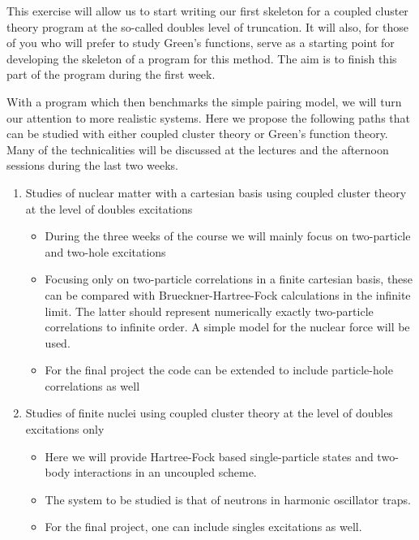\documentclass[%
twoside,                 %
final,                   %
10pt]{article}
\begin{document}
This exercise will allow us to start writing our first skeleton for a coupled cluster theory program at the so-called doubles level of truncation. It will also, for those of you who will prefer  to study Green's functions, serve as a 
starting point for developing the skeleton of a program for this method. The aim is to finish this part of the program during the first week.

With a program which then benchmarks the simple pairing model, we will turn our attention to more realistic systems.
Here we propose the following  paths that can be studied with either coupled cluster theory or Green's function theory. Many of the technicalities will be discussed at the lectures and the afternoon sessions during the last two weeks.

\begin{enumerate}
\item Studies of nuclear matter with a cartesian basis using coupled cluster theory at the level of doubles excitations
\begin{itemize}

  \item During the three weeks of the course we will mainly focus on two-particle and two-hole excitations 

  \item Focusing only on two-particle correlations in a finite cartesian basis, these can be compared with Brueckner-Hartree-Fock calculations in the infinite limit. The latter should represent numerically exactly two-particle correlations to infinite order. A simple model for the nuclear force will be used.

  \item For the final project the code can be extended to include particle-hole correlations as well

\end{itemize}

\noindent
\item Studies of finite nuclei using coupled cluster theory at the level of doubles excitations only
\begin{itemize}

  \item Here we will provide Hartree-Fock based single-particle states and two-body interactions in an uncoupled scheme.

  \item The system to be studied is that of neutrons in harmonic oscillator traps. 

  \item For the final project, one can include singles excitations as well.


\end{itemize}
\end{enumerate}
\end{document}
